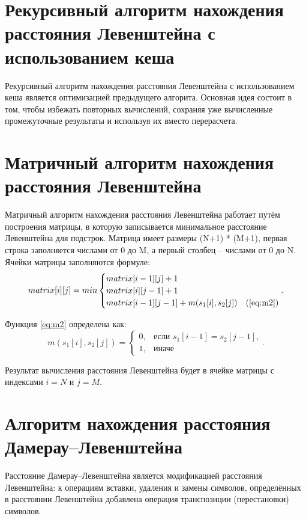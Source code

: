 \section{Рекурсивный алгоритм нахождения расстояния Левенштейна с использованием кеша}
Рекурсивный алгоритм нахождения расстояния Левенштейна с использованием кеша является оптимизацией предыдущего алгорита. Основная идея состоит в том, чтобы избежать повторных вычислений, сохраняя уже вычисленные промежуточные результаты и используя их вместо перерасчета.

\section{Матричный алгоритм нахождения расстояния Левенштейна}
Матричный алгоритм нахождения расстояния Левенштейна работает путём построения матрицы, в которую записывается минимальное расстояние Левенштейна для подстрок. Матрица имеет размеры (N+1) * (M+1), первая строка заполняется числами от 0 до M, а первый столбец – числами от 0 до N. Ячейки матрицы заполняются формуле:
\begin{equation}
	\label{eq:mat}
	matrix[i][j] = min \begin{cases}
		matrix[i-1][j] + 1\\
		matrix[i][j-1] + 1\\
		matrix[i-1][j-1] + m(s_{1}[i], s_{2}[j])&\text(\ref{eq:m2})\\
	\end{cases}.
\end{equation}

Функция \ref{eq:m2} определена как:
\begin{equation}
	\label{eq:m2}
	m(s_{1}[i], s_{2}[j]) = \begin{cases}
		0, &\text{если $s_{1}[i - 1] = s_{2}[j - 1]$,}\\
		1, &\text{иначе}
	\end{cases}.
\end{equation}

Результат вычисления расстояния Левенштейна будет в ячейке матрицы с индексами $i = N$ и $j = M$.

\section{Алгоритм нахождения расстояния Дамерау--Левенштейна}
Расстояние Дамерау--Левенштейна является модификацией расстояния Левенштейна: к операциям вставки, удаления и замены символов, определённых в расстоянии Левенштейна добавлена операция транспозиции (перестановки) символов.

